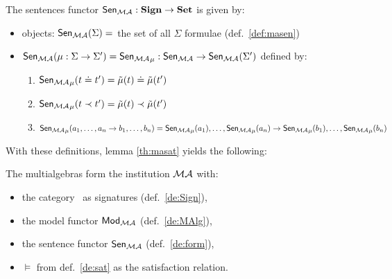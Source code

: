 \begin{definition}\label{de:form}
The sentences functor ${\sf {Sen_{{\mathcal{MA}}}}}: {\bf Sign}\to{\bf Set}$ is given by:
\begin{itemize}
\item objects: ${\sf {Sen_{{\mathcal{MA}}}}}(\Sigma) =$ {the set of all $\Sigma$
formulae} (def.~\ref{def:masen})
\item ${\sf {Sen_{{\mathcal{MA}}}}}(\mu: \Sigma \to \Sigma') = {\sf {Sen_{{\mathcal{MA}}}}}_{\mu}:{\sf {Sen_{{\mathcal{MA}}}}} \to {\sf {Sen_{{\mathcal{MA}}}}}(\Sigma')$ { defined by}:
		\begin{enumerate}
		\item ${\sf {Sen_{{\mathcal{MA}}}}}_{\mu}(t \mathrel{\dot{=} }  t') = {\tilde{\mu}}(t) \mathrel{\dot{=} } {\tilde{\mu}}(t')$
		\item ${\sf {Sen_{{\mathcal{MA}}}}}_{\mu}(t \prec  t') = {\tilde{\mu}}(t) \prec {\tilde{\mu}}(t')$
		\item ${\sf {Sen_{{\mathcal{MA}}}}}_{\mu}(a_1, \ldots ,a_n \to b_1, \ldots ,b_n) \\ = 
 {\sf {Sen_{{\mathcal{MA}}}}}_{\mu}(a_1), \ldots ,{\sf {Sen_{{\mathcal{MA}}}}}_{\mu}(a_n) \to {\sf {Sen_{{\mathcal{MA}}}}}_{\mu}(b_1), \ldots ,{\sf {Sen_{{\mathcal{MA}}}}}_{\mu}(b_n)$
		\end{enumerate}
	\end{itemize}
\end{definition}
%
With these definitions, lemma \ref{th:masat} yields the following:
\begin{fact}\label{fa:mainst}
The multialgebras form the institution ${\mathcal{MA}}$ with:
	\begin{itemize}
	\item the category \Sign\ as signatures (def.~\ref{de:Sign}),
	\item the model functor ${\sf {Mod_{{\mathcal{MA}}}}}$ (def.~\ref{de:MAlg}),
	\item the sentence functor ${\sf {Sen_{{\mathcal{MA}}}}}$ (def.~\ref{de:form}),
	\item $\models$ from def.~\ref{de:sat} as the satisfaction relation.
	\end{itemize}
	\end{fact}


